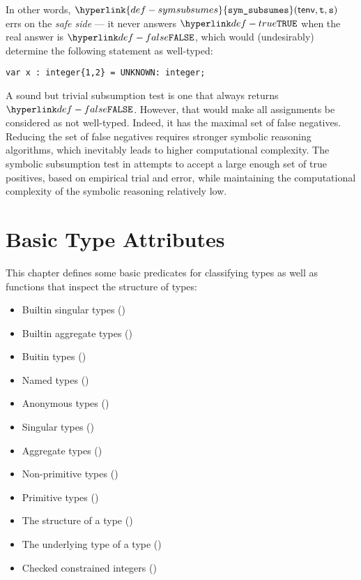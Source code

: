 \documentclass{book}
\newcommand\symsubsumes[0]{\hyperlink{def-symsubsumes}{\texttt{sym\_subsumes}}}
\newcommand\vt[0]{\texttt{t}}
\newcommand\vs[0]{\texttt{s}}
\begin{document}
In other words, $\symsubsumes(\tenv, \vt, \vs)$ errs on the \emph{safe side} ---
it never answers $\True$ when the real answer is $\False$, which would (undesirably)
determine the following statement as well-typed:
\begin{center}
  \verb|var x : integer{1,2} = UNKNOWN: integer;|
\end{center}

A sound but trivial subsumption test is one that always returns $\False$.
However, that would make all assignments be considered as not well-typed.
Indeed, it has the maximal set of false negatives.
Reducing the set of false negatives requires stronger symbolic reasoning algorithms,
which inevitably leads to higher computational complexity.
%
The symbolic subsumption test in 
attempts to accept a large enough set of true positives, based on empirical trial and error,
while maintaining the computational complexity of the symbolic reasoning relatively low.

\chapter{Basic Type Attributes}

This chapter defines some basic predicates for classifying types as well as
functions that inspect the structure of types:
\begin{itemize}
  \item Builtin singular types ()
  \item Builtin aggregate types ()
  \item Buitin types ()
  \item Named types ()
  \item Anonymous types ()
  \item Singular types ()
  \item Aggregate types ()
  \item Non-primitive types ()
  \item Primitive types ()
  \item The structure of a type ()
  \item The underlying type of a type ()
  \item Checked constrained integers ()
\end{itemize}
\end{document}
